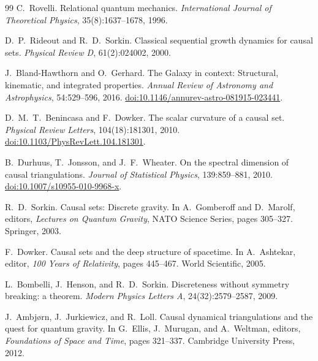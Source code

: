 \documentclass[11pt,a4paper]{article}
\theoremstyle{plain}
\theoremstyle{definition}
\theoremstyle{remark}
\begin{document}
\begin{thebibliography}{99}
C.~Rovelli.
\newblock Relational quantum mechanics.
\newblock \textit{International Journal of Theoretical Physics},
  35(8):1637--1678, 1996.

D.~P.~Rideout and R.~D.~Sorkin.
\newblock Classical sequential growth dynamics for causal sets.
\newblock \textit{Physical Review D}, 61(2):024002, 2000.

J.~Bland-Hawthorn and O.~Gerhard.
\newblock The Galaxy in context: Structural, kinematic, and integrated
  properties.
\newblock \emph{Annual Review of Astronomy and Astrophysics}, 54:529--596, 2016.
\newblock \href{https://doi.org/10.1146/annurev-astro-081915-023441}{doi:10.1146/annurev-astro-081915-023441}.

D.~M.~T.~Benincasa and F.~Dowker.
\newblock The scalar curvature of a causal set.
\newblock \emph{Physical Review Letters}, 104(18):181301, 2010.
\newblock \href{https://doi.org/10.1103/PhysRevLett.104.181301}{doi:10.1103/PhysRevLett.104.181301}.

B.~Durhuus, T.~Jonsson, and J.~F.~Wheater.
\newblock On the spectral dimension of causal triangulations.
\newblock \emph{Journal of Statistical Physics}, 139:859--881, 2010.
\newblock \href{https://doi.org/10.1007/s10955-010-9968-x}{doi:10.1007/s10955-010-9968-x}.

R.~D.~Sorkin.
\newblock Causal sets: Discrete gravity.
\newblock In A.~Gomberoff and D.~Marolf, editors, \textit{Lectures on Quantum
  Gravity}, NATO Science Series, pages 305--327. Springer, 2003.

F.~Dowker.
\newblock Causal sets and the deep structure of spacetime.
\newblock In A.~Ashtekar, editor, \textit{100 Years of Relativity}, pages
  445--467. World Scientific, 2005.

L.~Bombelli, J.~Henson, and R.~D.~Sorkin.
\newblock Discreteness without symmetry breaking: a theorem.
\newblock \textit{Modern Physics Letters A}, 24(32):2579--2587, 2009.

J.~Ambjørn, J.~Jurkiewicz, and R.~Loll.
\newblock Causal dynamical triangulations and the quest for quantum gravity.
\newblock In G.~Ellis, J.~Murugan, and A.~Weltman, editors,
  \textit{Foundations of Space and Time}, pages 321--337.
  Cambridge University Press, 2012.


\end{thebibliography}
\end{document}
